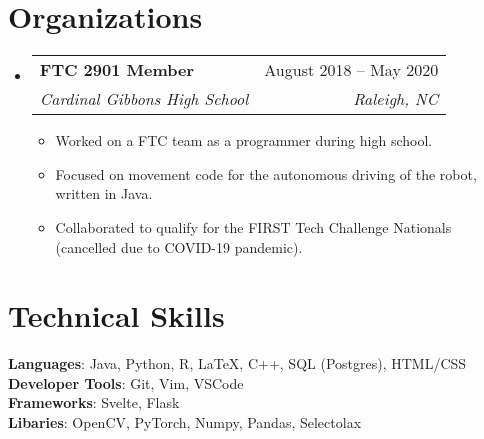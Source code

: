 \documentclass[letterpaper,10pt]{article}
\makeatletter
\newcommand{\resumeItem}[1]{
  \item\small{
    {#1 \vspace{-2pt}}
  }
}
\newcommand{\resumeSubheading}[4]{
  \vspace{-2pt}\item
    \begin{tabular*}{0.97\textwidth}[t]{l@{\extracolsep{\fill}}r}
      \textbf{#1} & #2 \\
      \textit{\small#3} & \textit{\small #4} \\
    \end{tabular*}\vspace{-7pt}
}
\newcommand{\resumeSubHeadingListStart}{\begin{itemize}[leftmargin=0.15in, label={}]}
\newcommand{\resumeSubHeadingListEnd}{\end{itemize}}
\newcommand{\resumeItemListStart}{\begin{itemize}}
\newcommand{\resumeItemListEnd}{\end{itemize}\vspace{-5pt}}
\makeatother
\begin{document}

\section{Organizations}
\resumeSubHeadingListStart

\resumeSubheading
      {FTC 2901 Member}{August 2018 -- May 2020}
      {Cardinal Gibbons High School}{Raleigh, NC}
      \resumeItemListStart
      	\resumeItem{Worked on a FTC team as a programmer during high school.}
      	\resumeItem{Focused on movement code for the autonomous driving of the robot, written in Java.}
        \resumeItem{Collaborated to qualify for the FIRST Tech Challenge Nationals (cancelled due to COVID-19 pandemic).}
      \resumeItemListEnd

\resumeSubHeadingListEnd





\section{Technical Skills}
 \begin{itemize}[leftmargin=0.15in, label={}]
    \small{\item{
     \textbf{Languages}{: Java, Python, R, 
     \LaTeX, C++, SQL (Postgres), HTML/CSS} \\
     \textbf{Developer Tools}{: Git, Vim, VSCode} \\
    \textbf{Frameworks}{: Svelte, Flask}\\
    \textbf{Libaries}{: OpenCV, PyTorch, Numpy, Pandas, Selectolax}
    }}
 \end{itemize}


\end{document}
